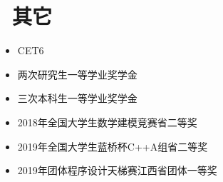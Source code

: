 \documentclass{resume}
\begin{document}
\vspace{1.2ex}
\section{\faInfo\ 其它}
\begin{itemize}[parsep=0.5ex]
\item CET6
\item 两次研究生一等学业奖学金
\item 三次本科生一等学业奖学金
\item 2018年全国大学生数学建模竞赛省二等奖
\item 2019年全国大学生蓝桥杯C++A组省二等奖
\item 2019年团体程序设计天梯赛江西省团体一等奖

\end{itemize}
\end{document}

